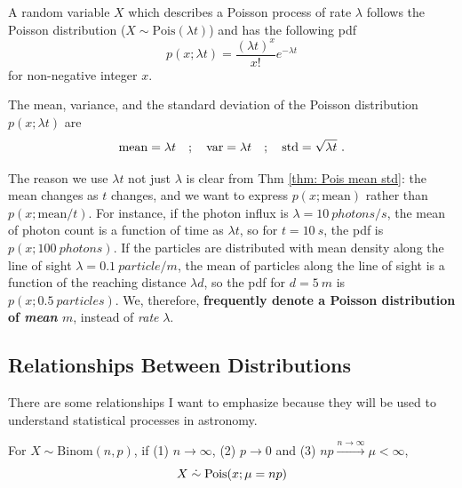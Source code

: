 \begin{defn} \label{def: Pois pdf}
A random variable $ X $ which describes a Poisson process of rate $ \lambda $ follows the Poisson distribution ($ X \sim \mathrm{Pois}(\lambda t) $) and has the following pdf
\begin{equation} \label{eq: Pois pdf}
  p(x; \lambda t) = \frac{(\lambda t)^{x}}{x!} e^{-\lambda t}
\end{equation}
for non-negative integer $ x $.
\end{defn}

\begin{thm} \label{thm: Pois mean std}
The mean, variance, and the standard deviation of the Poisson distribution $ p(x; \lambda t) $ are
\begin{equation}\label{eq: Pois mean std}
  \mathrm{mean} = \lambda t
  \quad;\quad
  \mathrm{var} = \lambda t
  \quad;\quad
  \mathrm{std} = \sqrt{\lambda t} ~.
\end{equation}
\end{thm}
The reason we use $ \lambda t $ not just $ \lambda $ is clear from Thm \ref{thm: Pois mean std}: the mean changes as $ t $ changes, and we want to express $ p(x; \mathrm{mean}) $ rather than $ p(x; \mathrm{mean} / t) $. For instance, if the photon influx is $ \lambda = \SI{10}{photons / s} $, the mean of photon count is a function of time as $ \lambda t $, so for $ t = \SI{10}{s} $, the pdf is $ p(x; \SI{100}{photons}) $. If the particles are distributed with mean density along the line of sight $ \lambda = \SI{0.1}{particle / m} $, the mean of particles along the line of sight is a function of the reaching distance $ \lambda d $, so the pdf for $ d = \SI{5}{m} $ is $ p(x; \SI{0.5}{particles}) $. We, therefore, \textbf{frequently denote a Poisson distribution of \textit{mean} $ m $}, instead of \textit{rate} $ \lambda $.

\subsection{Relationships Between Distributions}
There are some relationships I want to emphasize because they will be used to understand statistical processes in astronomy. 

\begin{thm}
For $ X \sim \mathrm{Binom}(n, p) $, if (1) $ n \rightarrow \infty $, (2) $ p \rightarrow 0 $ and (3) $ np \xrightarrow{n \rightarrow \infty} \mu < \infty $, 
  \begin{equation}\label{eq: binom to pois}
    X \mathrel{\dot{\sim}} \mathrm{Pois}(x; \mu = np)
  \end{equation}
\end{thm}

